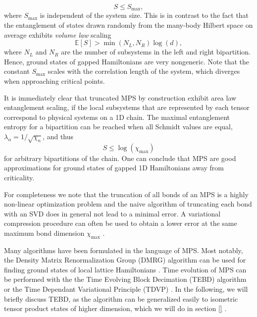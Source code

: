 \begin{equation}
	S \le S_\text{max}, 
\end{equation}
where $S_\text{max}$ is independent of the system size. This is in contrast to the fact that the entanglement of states drawn randomly from the many-body Hilbert space on average exhibits \textit{volume law} scaling
\begin{equation}
	\mathbb{E}\left[S\right] > \min\left(N_L, N_R\right)\log(d),
\end{equation}
where $N_L$ and $N_R$ are the number of subsystems in the left and right bipartition. Hence, ground states of gapped Hamiltonians are very nongeneric. Note that the constant $S_\text{max}$ scales with the correlation length of the system, which diverges when approaching critical points. \par
It is immediately clear that truncated MPS by construction exhibit area law entanglement scaling, if the local subsystems that are represented by each tensor correspond to physical systems on a 1D chain. The maximal entanglement entropy for a bipartition can be reached when all Schmidt values are equal, $\lambda_\alpha = 1/\sqrt{\chi_n}$, and thus
\begin{equation}
	S \le \log\left(\chi_\text{max}\right)
\end{equation}
for arbitrary bipartitions of the chain. One can conclude that MPS are good approximations for ground states of gapped 1D Hamiltonians away from criticality. \par 
For completeness we note that the truncation of all bonds of an MPS is a highly non-linear optimization problem and the naive algorithm of truncating each bond with an SVD does in general not lead to a minimal error. A variational compression procedure can often be used to obtain a lower error at the same maximum bond dimension $\chi_\text{max}$ \cite{cite:DMRG_in_the_age_of_MPS}.
\par
Many algorithms have been formulated in the language of MPS. Most notably, the Density Matrix Renormalization Group (DMRG) algorithm can be used for finding ground states of local lattice Hamiltonians \cite{cite:DMRG_in_the_age_of_MPS}. Time evolution of MPS can be performed with the the Time Evolving Block Decimation (TEBD) algorithm \cite{cite:efficient_simulation_of_1D_quantum_many_body_systems, cite:matrix_product_density_operators_simulation_of_finite_temperature_and_dissipative_systems} or the Time Dependant Variational Principle (TDVP) \cite{cite:time_dependent_variational_principle_for_quantum_lattices, cite:unifying_time_evolution_and_optimization_with_MPS}. In the following, we will briefly discuss TEBD, as the algorithm can be generalized easily to isometric tensor product states of higher dimension, which we will do in section \ref{} . \par

